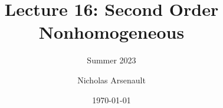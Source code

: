 \documentclass[aspectratio=169,xcolor=dvipsnames]{beamer}
\title[MA214]{Lecture 16: Second Order Nonhomogeneous} %
\subtitle{Summer 2023}
\author[Nicholas Arsenault] {Nicholas Arsenault}
\institute[UKY] %
{
    Department of Mathematics \\
    University of Kentucky %
}
\date{\today} %
\begin{document}
\begin{frame}
    \titlepage
\end{frame}
\begin{frame}
  \frametitle{}
\end{frame}
\end{document}
